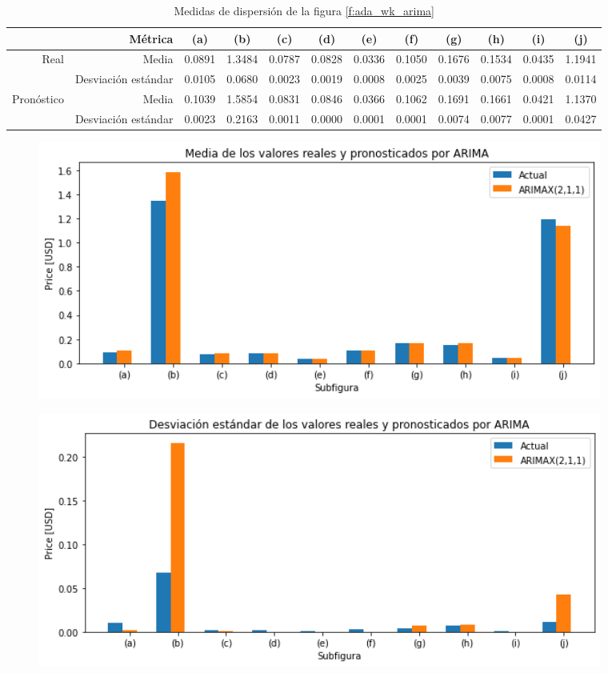 \documentclass[a4paper,10pt]{article}
\begin{document}
\begin{table}[H]
 \begin{center}
 \resizebox{12cm}{!} {
  \begin{tabular}{|r|r|c|c|c|c|c|c|c|c|c|c|}
    & Métrica & (a) & (b) & (c) & (d) & (e) & (f) & (g) & (h) & (i) & (j) \\ \hline
    Real & Media & 0.0891& 1.3484 & 0.0787& 0.0828 & 0.0336& 0.1050& 0.1676& 0.1534& 0.0435& 1.1941  \\
    & Desviación estándar & 0.0105& 0.0680& 0.0023& 0.0019& 0.0008& 0.0025& 0.0039& 0.0075& 0.0008 &0.0114 \\
    Pronóstico & Media & 0.1039& 1.5854& 0.0831& 0.0846& 0.0366& 0.1062& 0.1691& 0.1661& 0.0421& 1.1370 \\
    & Desviación estándar & 0.0023& 0.2163& 0.0011& 0.0000 & 0.0001& 0.0001& 0.0074& 0.0077& 0.0001& 0.0427 \\ \hline
  \end{tabular}
  }
  \caption{Medidas de dispersión de la figura \ref{f:ada_wk_arima}}
  \label{tab:ada_wk_avestd}
 \end{center}
\end{table}

\begin{figure}[H]
\centering
\includegraphics[width=0.9\textwidth]{./plots/arima/plots_ada_random_weekly/ave}
\label{f:ada_ave_wk}
\end{figure}


\begin{figure}[H]
\centering
\includegraphics[width=0.9\textwidth]{./plots/arima/plots_ada_random_weekly/std}
\label{f:ada_std_wk}
\end{figure}
\end{document}

